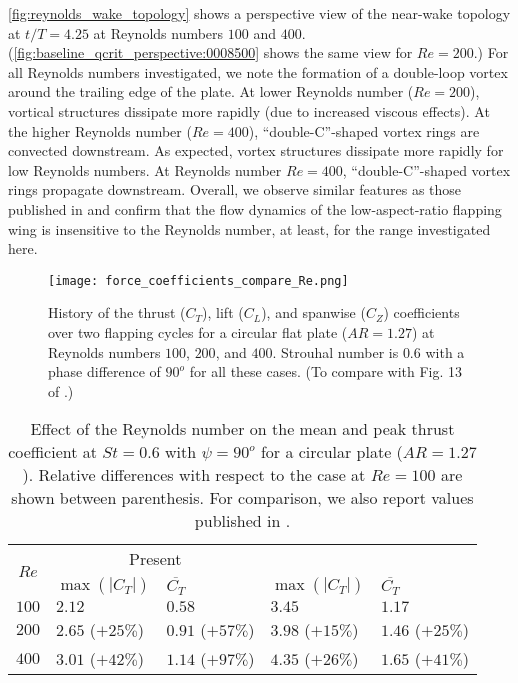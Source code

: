 \cref{fig:reynolds_wake_topology} shows a perspective view of the near-wake topology at $t/T = 4.25$ at Reynolds numbers $100$ and $400$.
(\cref{fig:baseline_qcrit_perspective:0008500} shows the same view for $Re = 200$.)
For all Reynolds numbers investigated, we note the formation of a double-loop vortex around the trailing edge of the plate.
At lower Reynolds number ($Re = 200$), vortical structures dissipate more rapidly (due to increased viscous effects).
At the higher  Reynolds number ($Re = 400$), ``double-C''-shaped vortex rings are convected downstream.
As expected, vortex structures dissipate more rapidly for low Reynolds numbers.
At Reynolds number $Re = 400$, ``double-C''-shaped vortex rings propagate downstream.
Overall, we observe similar features as those published in \citet{li_dong_2016} and confirm that the flow dynamics of the low-aspect-ratio flapping wing is insensitive to the Reynolds number, at least, for the range investigated here.

\begin{figure}[!h]
  \centering
  \texttt{[image: force\_coefficients\_compare\_Re.png]}
  \caption{History of the thrust ($C_T$), lift ($C_L$), and spanwise ($C_Z$) coefficients over two flapping cycles for a circular flat plate ($AR = 1.27$) at Reynolds numbers $100$, $200$, and $400$. Strouhal number is $0.6$ with a phase difference of $90^o$ for all these cases. (To compare with Fig. 13 of \citet{li_dong_2016}.)}
  \label{fig:reynolds_force_coefficients}
\end{figure}

\begin{table}[!h]
  \centering
  \begin{tabular}{cllll}
    \hline\hline
    \multirow{2}{*}{$Re$} &
      \multicolumn{2}{c}{Present} &
      \multicolumn{2}{c}{\citet{li_dong_2016}} \\
    & $\max \left( |C_T| \right)$ & $\overline{C_T}$ & $\max \left( |C_T| \right)$ & $\overline{C_T}$ \\
    \hline
    $100$ & $2.12$ & $0.58$ & $3.45$ & $1.17$ \\
    $200$ & $2.65$ ($+25\%$) & $0.91$ ($+57\%$) & $3.98$ ($+15\%$) & $1.46$ ($+25\%$) \\
    $400$ & $3.01$ ($+42\%$) & $1.14$ ($+97\%$) & $4.35$ ($+26\%$) & $1.65$ ($+41\%$) \\
    \hline\hline
  \end{tabular}
  \caption{Effect of the Reynolds number on the mean and peak thrust coefficient at $St = 0.6$ with $\psi = 90^o$ for a circular plate ($AR = 1.27$). Relative differences with respect to the case at $Re = 100$ are shown between parenthesis. For comparison, we also report values published in \citet{li_dong_2016}.}
  \label{tab:reynolds_thrust_stats}
\end{table}

